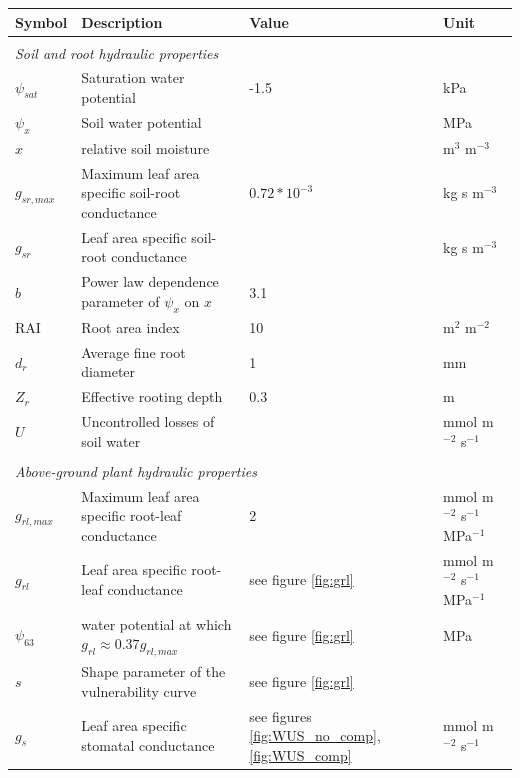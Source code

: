 \documentclass[utf8]{frontiersSCNS} %
\begin{document}
\begin{table}[h]
    \centering
    \begin{tabular}{l l l l}
        Symbol & Description & Value & Unit \\
        \hline
        \multicolumn{4}{l}{}\\
        \multicolumn{4}{l}{\textit{Soil and root hydraulic properties}}\\
        \hline
        $\psi_{sat}$ & Saturation water potential & -1.5 & kPa\\
        $\psi_x$ & Soil water potential & & MPa\\
        $x$ & relative soil moisture & & m$^{3}$ m$^{-3}$\\
        $g_{sr,max}$ & Maximum leaf area specific soil-root conductance & $0.72 * 10^{-3}$ & kg s m$^{-3}$ \\
        $g_{sr}$ & Leaf area specific soil-root conductance & & kg s m$^{-3}$\\
        $b$ & Power law dependence parameter of $\psi_x$ on $x$ & 3.1 & \\
        RAI & Root area index & 10 & m$^{2}$ m$^{-2}$\\
        $d_r$ & Average fine root diameter & 1 & mm \\
        $Z_r$ & Effective rooting depth & 0.3 & m\\ 
        $U$ & Uncontrolled losses of soil water & & mmol m$^{-2}$ s$^{-1}$\\
        \hline
        \multicolumn{4}{l}{}\\
        \multicolumn{4}{l}{\textit{Above-ground plant hydraulic properties}}\\
        \hline
        $g_{rl,max}$ & Maximum leaf area specific root-leaf conductance & 2 & mmol m$^{-2}$ s$^{-1}$ MPa$^{-1}$ \\
        $g_{rl}$ & Leaf area specific root-leaf conductance & see figure \ref{fig:grl} & mmol m$^{-2}$ s$^{-1}$ MPa$^{-1}$ \\
        $\psi_{63}$ & water potential at which $g_{rl} \approx 0.37 g_{rl,max}$ & see figure \ref{fig:grl} & MPa \\
        $s$ & Shape parameter of the vulnerability curve & see figure \ref{fig:grl} &  \\
        $g_s$ & Leaf area specific stomatal conductance & see figures \ref{fig:WUS_no_comp}, \ref{fig:WUS_comp} & mmol m$^{-2}$ s$^{-1}$ \\

\end{tabular}
\end{table}
\end{document}
